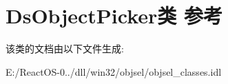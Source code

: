 \hypertarget{class_ds_object_picker}{}\section{Ds\+Object\+Picker类 参考}
\label{class_ds_object_picker}


该类的文档由以下文件生成\+:\begin{DoxyCompactItemize}
\item 
E\+:/\+React\+O\+S-\/0../dll/win32/objsel/objsel\+\_\+classes.\+idl\end{DoxyCompactItemize}
